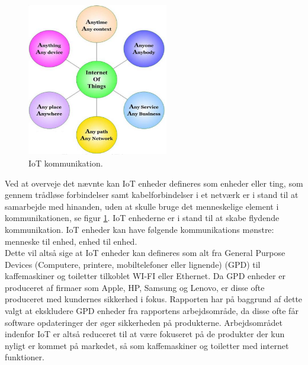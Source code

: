         \begin{figure}[H]
            \centering
                \includegraphics[width=0.55\textwidth]{figures/IoT_definition.png}
            \caption{IoT kommunikation.\autocite{Sundmaeker2010}}\label{fig:IOTkom}
        \end{figure}
        Ved at overveje det nævnte kan IoT enheder defineres som enheder eller ting, som gennem trådløse forbindelser samt kabelforbindelser i et netværk er i stand til at samarbejde med hinanden, uden at skulle bruge det menneskelige element i kommunikationen, se figur \ref{fig:IOTkom}. IoT enhederne er i stand til at skabe flydende kommunikation.\autocite{Hashmi2017}
        IoT enheder kan have følgende kommunikations mønstre: menneske til enhed, enhed til enhed.\\
        Dette vil altså sige at IoT enheder kan defineres som alt fra General Purpose Devices (Computere, printere, mobiltelefoner eller lignende) (GPD) til kaffemaskiner og toiletter tilkoblet WI-FI eller Ethernet. Da GPD enheder er produceret af firmaer som Apple, HP, Samsung og Lenovo, er disse ofte produceret med kundernes sikkerhed i fokus. Rapporten har på baggrund af dette valgt at ekskludere GPD enheder fra rapportens arbejdsområde, da disse ofte får software opdateringer der øger sikkerheden på produkterne.
        Arbejdsområdet indenfor IoT er altså reduceret til at være fokuseret på de produkter der kun nyligt er kommet på markedet, så som kaffemaskiner og toiletter med internet funktioner. \\
